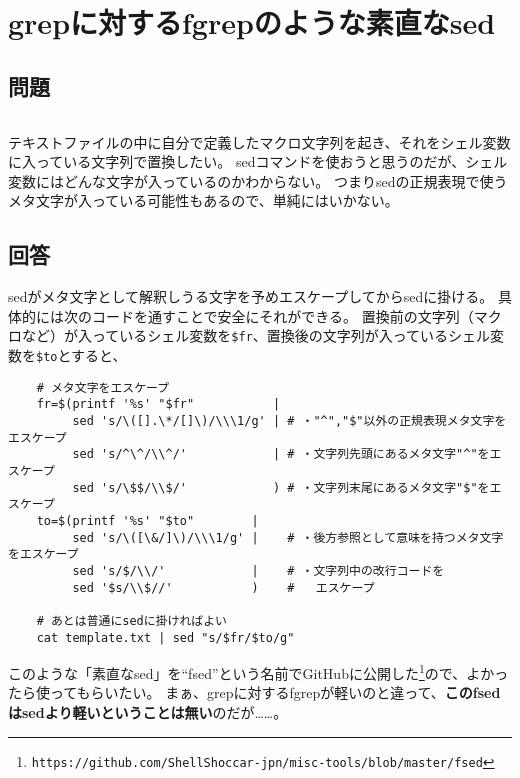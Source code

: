 \section{grepに対するfgrepのような素直なsed}

\subsection*{問題}
\noindent
$\!\!\!\!\!$
\begin{grshfboxit}{160.0mm}
	テキストファイルの中に自分で定義したマクロ文字列を起き、それをシェル変数に入っている文字列で置換したい。
	sedコマンドを使おうと思うのだが、シェル変数にはどんな文字が入っているのかわからない。
	つまりsedの正規表現で使うメタ文字が入っている可能性もあるので、単純にはいかない。
\end{grshfboxit}

\subsection*{回答}
sedがメタ文字として解釈しうる文字を予めエスケープしてからsedに掛ける。
具体的には次のコードを通すことで安全にそれができる。
置換前の文字列（マクロなど）が入っているシェル変数を\verb|$fr|、置換後の文字列が入っているシェル変数を\verb|$to|とすると、

\noindent
\begin{frameboxit}{160.0mm}
\begin{verbatim}
	# メタ文字をエスケープ
	fr=$(printf '%s' "$fr"           |
	     sed 's/\([].\*/[]\)/\\\1/g' | # ・"^","$"以外の正規表現メタ文字をエスケープ
	     sed 's/^\^/\\^/'            | # ・文字列先頭にあるメタ文字"^"をエスケープ
	     sed 's/\$$/\\$/'            ) # ・文字列末尾にあるメタ文字"$"をエスケープ
	to=$(printf '%s' "$to"        |
	     sed 's/\([\&/]\)/\\\1/g' |    # ・後方参照として意味を持つメタ文字をエスケープ
	     sed 's/$/\\/'            |    # ・文字列中の改行コードを
	     sed '$s/\\$//'           )    #   エスケープ

	# あとは普通にsedに掛ければよい
	cat template.txt | sed "s/$fr/$to/g"
\end{verbatim}
\end{frameboxit}

このような「素直なsed」を``fsed''という名前でGitHubに公開した\footnote{\verb|https://github.com/ShellShoccar-jpn/misc-tools/blob/master/fsed|}ので、よかったら使ってもらいたい。
まぁ、grepに対するfgrepが軽いのと違って、\textbf{このfsedはsedより軽いということは無い}のだが……。

